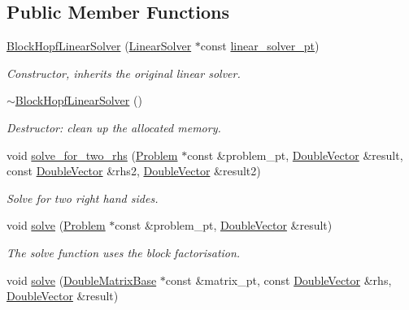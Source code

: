 \subsection*{Public Member Functions}
\begin{DoxyCompactItemize}
\item 
\hyperlink{classoomph_1_1BlockHopfLinearSolver_ab8257cd5a04b20ae0d5e53ee1f9e2abd}{Block\+Hopf\+Linear\+Solver} (\hyperlink{classoomph_1_1LinearSolver}{Linear\+Solver} $\ast$const \hyperlink{classoomph_1_1BlockHopfLinearSolver_ada05d83bb3b4b1024dd19bf07d4374eb}{linear\+\_\+solver\+\_\+pt})
\begin{DoxyCompactList}\small\item\em Constructor, inherits the original linear solver. \end{DoxyCompactList}\item 
\hyperlink{classoomph_1_1BlockHopfLinearSolver_a7a77bcca3b3018995f644fff39c7a957}{$\sim$\+Block\+Hopf\+Linear\+Solver} ()
\begin{DoxyCompactList}\small\item\em Destructor\+: clean up the allocated memory. \end{DoxyCompactList}\item 
void \hyperlink{classoomph_1_1BlockHopfLinearSolver_a9a7cc6bda9ab1a8baf83d5d8e1fe5eea}{solve\+\_\+for\+\_\+two\+\_\+rhs} (\hyperlink{classoomph_1_1Problem}{Problem} $\ast$const \&problem\+\_\+pt, \hyperlink{classoomph_1_1DoubleVector}{Double\+Vector} \&result, const \hyperlink{classoomph_1_1DoubleVector}{Double\+Vector} \&rhs2, \hyperlink{classoomph_1_1DoubleVector}{Double\+Vector} \&result2)
\begin{DoxyCompactList}\small\item\em Solve for two right hand sides. \end{DoxyCompactList}\item 
void \hyperlink{classoomph_1_1BlockHopfLinearSolver_a5e9ff24466ec138cca8264e5befc31fe}{solve} (\hyperlink{classoomph_1_1Problem}{Problem} $\ast$const \&problem\+\_\+pt, \hyperlink{classoomph_1_1DoubleVector}{Double\+Vector} \&result)
\begin{DoxyCompactList}\small\item\em The solve function uses the block factorisation. \end{DoxyCompactList}\item 
void \hyperlink{classoomph_1_1BlockHopfLinearSolver_ac8f7442b3bc437f8ad25308b1c84482b}{solve} (\hyperlink{classoomph_1_1DoubleMatrixBase}{Double\+Matrix\+Base} $\ast$const \&matrix\+\_\+pt, const \hyperlink{classoomph_1_1DoubleVector}{Double\+Vector} \&rhs, \hyperlink{classoomph_1_1DoubleVector}{Double\+Vector} \&result)

\end{DoxyCompactItemize}
